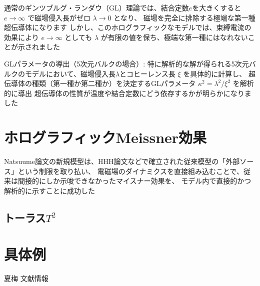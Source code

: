 \documentclass[b5paper,11pt,dvipdfmx]{jsarticle}
\numberwithin{equation}{section}
\theoremstyle{definition}
\begin{document}
通常のギンツブルグ・ランダウ（GL）理論では、結合定数$e$を大きくすると
$e\rightarrow\infty$ で磁場侵入長がゼロ $\lambda \to 0$ となり、
磁場を完全に排除する極端な第一種超伝導体になります
しかし、このホログラフィックなモデルでは、束縛電流の効果により
$e\rightarrow\infty$ としても $\lambda$ が有限の値を保ち、極端な第一種にはなれないことが示されました

GLパラメータの導出（5次元バルクの場合）:
特に解析的な解が得られる5次元バルクのモデルにおいて、磁場侵入長$\lambda$とコヒーレンス長 $\xi$ を具体的に計算し、
超伝導体の種類（第一種か第二種か）を決定するGLパラメータ $\kappa^2 = \lambda^2 / \xi^2$ を解析的に導出
超伝導体の性質が温度や結合定数にどう依存するかが明らかになりました

\section{ホログラフィックMeissner効果}

Natsuume論文の新規模型は、HHH論文などで確立された従来模型の「外部ソース」という制限を取り払い、
電磁場のダイナミクスを直接組み込むことで、従来は間接的にしか示唆できなかったマイスナー効果を、
モデル内で直接的かつ解析的に示すことに成功した

\subsection{\texorpdfstring{トーラス$T^2$}{トーラスT2}}

\section{具体例}

\cite{a}

\begin{thebibliography}{99}
 夏梅
 文献情報
\end{thebibliography}
\end{document}

